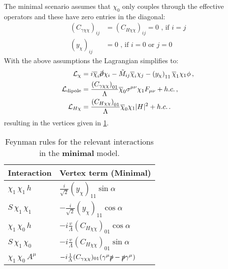 \documentclass[a4paper,11pt]{article}
\begin{document}
The minimal scenario assumes that $\chi_0$ only couples through the effective operators and these have zero entries in the diagonal:
\begin{align}
	(C_{\gamma\chi\chi})_{ij} &= (C_{H\chi\chi})_{ij} = 0 \mbox{ , if $i = j$} \\
	(y_{\chi})_{ij} & = 0 \mbox{ , if $i = 0$ or $j = 0$ }
\end{align}
With the above assumptions the Lagrangian simplifies to:
\begin{align}
	\mathcal{L}_\chi &=  i \overline{\chi}_i \cancel \partial \chi_i - \tilde{M}_{ij} \overline{\chi}_i \chi_j - \left(y_\chi\right)_{11} \overline{\chi}_1 \chi_1 \phi \,, \\
	\mathcal{L}_{\rm dipole} &= \frac{\left(C_{\gamma \chi \chi}\right)_{01}}{\Lambda} \overline{\chi}_0 \sigma^{\mu\nu} \chi_1 F_{\mu\nu} + h.c. \,,\\
	\mathcal{L}_{H\chi} &= \frac{\left(C_{H \chi \chi}\right)_{01}}{\Lambda} \overline{\chi}_0 \chi_1 |H|^2 + h.c. \,.
\end{align}
resulting in the vertices given in \cref{tab:feynmanRules2}.

\begin{table}[h!]   \centering
	\vspace{0.2cm}
	\caption{Feynman rules for the relevant interactions in the {\bf minimal} model. \label{tab:feynmanRules2}}
	\begin{tabular}{p{2cm}|p{4.5cm}}
		\toprule
		\textbf{Interaction} & \textbf{Vertex term (Minimal)}\\ \toprule 
		$ \chi_1\,\chi_1\,h$ & $\frac{i}{\sqrt{2}} (y_{\chi})_{11} \sin\alpha$\\
		$S\,\chi_1\,\chi_1$  & $-\frac{i}{\sqrt{2}} (y_{\chi})_{11} \cos\alpha $\\
		$\chi_1\,\chi_0\,h$  & $-i \frac{v}{\Lambda} (C_{H\chi\chi})_{01} \cos\alpha$\\
		$S\,\chi_1\,\chi_0$ &  $-i \frac{v}{\Lambda} (C_{H\chi\chi})_{01} \sin\alpha$\\
		$\chi_1\,\chi_0\, A^\mu$  & $-i \frac{1}{\Lambda} (C_{\gamma\chi\chi})_{01} (\gamma^\mu \slashed{p} - \slashed{p} \gamma^\mu)$\\
		\bottomrule        
	\end{tabular}
\end{table}

%
%
\end{document}
